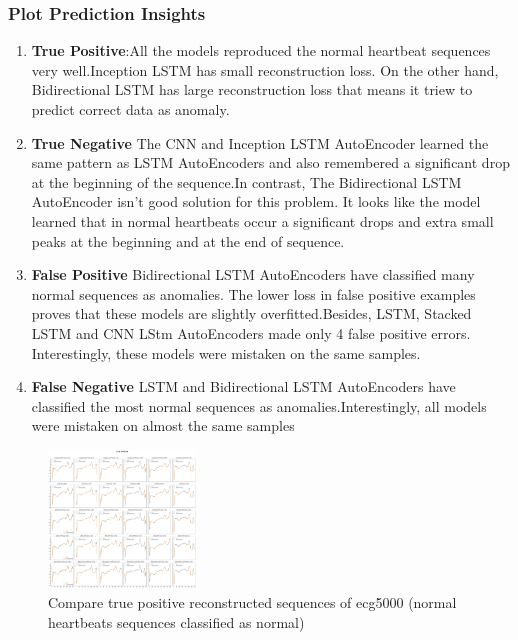 \documentclass[nonacm,sigconf]{acmart}
\begin{document}
\subsubsection{\textbf{Plot Prediction Insights}}
\begin{enumerate}
    \item \textbf{True Positive}:All the models reproduced the normal heartbeat sequences very well.Inception LSTM has small reconstruction loss. On the other hand, Bidirectional LSTM has large reconstruction loss that means it triew to predict correct data as anomaly.
    \item \textbf{True Negative}
    The CNN and Inception LSTM AutoEncoder learned the same pattern as LSTM AutoEncoders and also remembered a significant drop at the beginning of the sequence.In contrast, The Bidirectional LSTM AutoEncoder isn't good solution for this problem. It looks like the model learned that in normal heartbeats occur a significant drops and extra small peaks at the beginning and at the end of sequence.

    \item \textbf{False Positive}
    Bidirectional LSTM AutoEncoders have classified many normal sequences as anomalies. The lower loss in false positive examples proves that these models are slightly overfitted.Besides, LSTM, Stacked LSTM and CNN LStm AutoEncoders made only 4 false positive errors. Interestingly, these models were mistaken on the same samples.

    \item \textbf{False Negative}
    LSTM and Bidirectional LSTM AutoEncoders have classified the most normal sequences as anomalies.Interestingly, all models were mistaken on almost the same samples    
\end{enumerate}
    \begin{figure}
        \centering
        \includegraphics[width=0.35\textwidth]{ecg5000/TP.png}
        \caption{Compare true positive reconstructed sequences of ecg5000 (normal heartbeats sequences classified as normal)}
        \label{fig:image1}
    \end{figure}%
\end{document}
